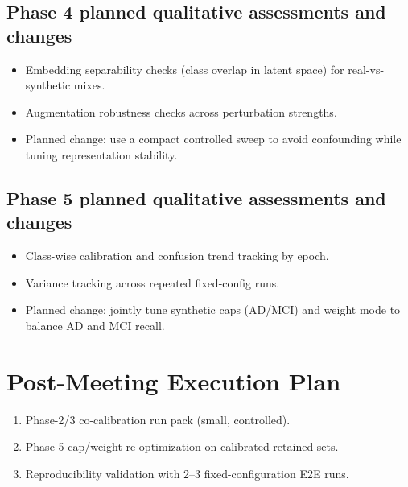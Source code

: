 \documentclass[11pt,a4paper]{article}
\begin{document}
\subsection{Phase 4 planned qualitative assessments and changes}
\begin{itemize}[leftmargin=1.2em]
    \item Embedding separability checks (class overlap in latent space) for real-vs-synthetic mixes.
    \item Augmentation robustness checks across perturbation strengths.
    \item Planned change: use a compact controlled sweep to avoid confounding while tuning representation stability.
\end{itemize}

\subsection{Phase 5 planned qualitative assessments and changes}
\begin{itemize}[leftmargin=1.2em]
    \item Class-wise calibration and confusion trend tracking by epoch.
    \item Variance tracking across repeated fixed-config runs.
    \item Planned change: jointly tune synthetic caps (AD/MCI) and weight mode to balance AD and MCI recall.
\end{itemize}

\section{Post-Meeting Execution Plan}
\begin{enumerate}[leftmargin=1.2em]
    \item Phase-2/3 co-calibration run pack (small, controlled).
    \item Phase-5 cap/weight re-optimization on calibrated retained sets.
    \item Reproducibility validation with 2--3 fixed-configuration E2E runs.
\end{enumerate}
\end{document}
